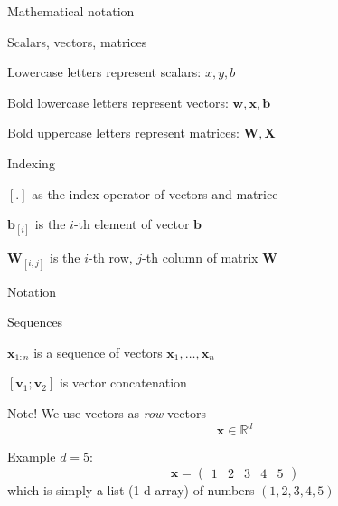 \documentclass[12pt,aspectratio=169,handout]{beamer}
\begin{document}
\begin{frame}{Mathematical notation}

\begin{block}{Scalars, vectors, matrices}

Lowercase letters represent scalars: $x, y, b$
	
Bold lowercase letters represent vectors: $\bm{w}, \bm{x}, \bm{b}$

Bold uppercase letters represent matrices: $\bm{W}, \bm{X}$

\end{block}

\begin{block}{Indexing}
	
$[ . ]$ as the index operator of vectors and matrice

$\bm{b}_{[i]}$ is the $i$-th element of vector $\bm{b}$

$\bm{W}_{[i,j]}$ is the $i$-th row, $j$-th column of matrix $\bm{W}$
\end{block}

\end{frame}


\begin{frame}{Notation}
	
\begin{block}{Sequences}

$\bm{x}_{1:n}$ is a sequence of vectors $\bm{x}_1, \ldots, \bm{x}_n$

$[\bm{v}_1 ; \bm{v}_2]$ is vector concatenation
	
\end{block}
	
\begin{block}{Note! We use vectors as \emph{row} vectors}
$$
\bm{x} \in \mathbb{R}^{d}
$$
\end{block}

Example $d = 5$:
$$
\bm{x} = \begin{pmatrix}
1 & 2 & 3 & 4 & 5
\end{pmatrix}
$$
which is simply a list (1-d array) of numbers $(1, 2, 3, 4, 5)$

\end{frame}
\end{document}
